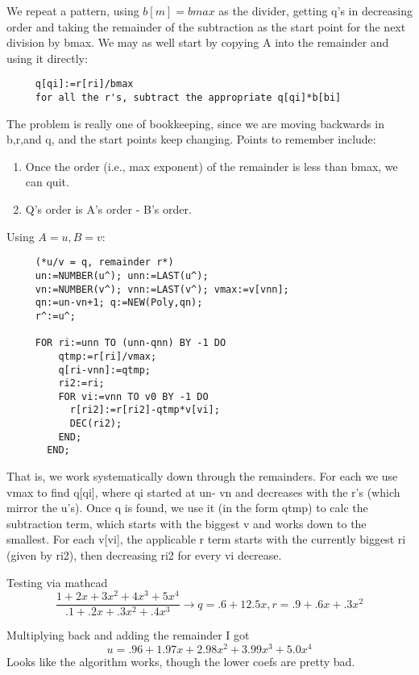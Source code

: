 We repeat a pattern, using $b[m]=bmax$ as the divider, getting
q's in decreasing order and taking the remainder of the
subtraction as the start point for the next division by
bmax.  We may as well start by copying A into the remainder
and using it directly:
\begin{verbatim}
     q[qi]:=r[ri]/bmax
     for all the r's, subtract the appropriate q[qi]*b[bi]
\end{verbatim}

The problem is really one of bookkeeping, since we are
moving backwards in b,r,and q, and the start points keep
changing.  Points to remember include:
\begin{enumerate}
     \item Once the order (i.e., max exponent) of the remainder
       is less than bmax, we can quit.
     \item Q's order is A's order - B's order.
\end{enumerate}
     
Using $A=u, B=v$:
\begin{tt} \begin{verbatim}
     (*u/v = q, remainder r*)
     un:=NUMBER(u^); unn:=LAST(u^);
     vn:=NUMBER(v^); vnn:=LAST(v^); vmax:=v[vnn];
     qn:=un-vn+1; q:=NEW(Poly,qn);
     r^:=u^;
     
     FOR ri:=unn TO (unn-qnn) BY -1 DO
         qtmp:=r[ri]/vmax;
         q[ri-vnn]:=qtmp;
         ri2:=ri;
         FOR vi:=vnn TO v0 BY -1 DO
           r[ri2]:=r[ri2]-qtmp*v[vi];
           DEC(ri2);
         END;
       END;
\end{verbatim} \end{tt}

That is, we work systematically down through the remainders.
For each we use vmax to find q[qi], where qi started at un-
vn and decreases with the r's (which mirror the u's).  Once
q is found, we use it (in the form qtmp) to calc the
subtraction term, which starts with the biggest v and works
down to the smallest.  For each v[vi], the applicable r term
starts with the currently biggest ri (given by ri2), then
decreasing ri2 for every vi decrease.

Testing via mathcad
\begin{equation}
   \frac{1+2x+3x^2+4x^3+5x^4}{.1+.2x+.3x^2+.4x^3} 
     \rightarrow q=.6+12.5x, r=.9+.6x+.3x^2
\end{equation}
    
Multiplying back and adding the remainder I got
\begin{equation}
     u= .96+1.97x+2.98x^2+3.99x^3+5.0x^4
\end{equation}
Looks like the algorithm works, though the lower coefs are
pretty bad.


